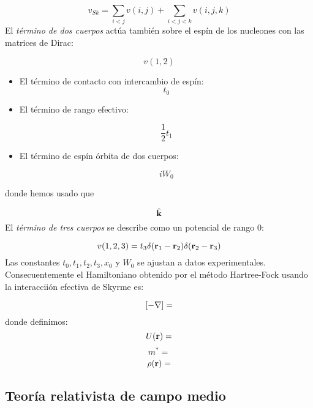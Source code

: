 \begin{equation}
    v_{Sk} = \sum_{i<j} v(i,j) + \sum_{i<j<k} v(i,j,k)
\end{equation}
El \textit{término de dos cuerpos} actúa también sobre el espín de los nucleones con las matrices de Dirac:

\begin{equation}
    v(1,2)    
\end{equation}

\begin{itemize}
    \item El término de contacto con intercambio de espín:
    \begin{equation*}
        t_0 
    \end{equation*}
    \item El término de rango efectivo:
    
    \begin{equation*}
        \frac{1}{2} t_1
    \end{equation*}
    \item El término de espín órbita de dos cuerpos:
    
    \begin{equation*}
        i W_0
    \end{equation*}
\end{itemize}
donde hemos usado que 

\begin{equation}
    \hat{\mathbf{k}}
\end{equation}
El \textit{término de tres cuerpos} se describe como un potencial de rango 0:

\begin{equation}
    v(1,2,3) = t_3 \delta (\mathbf{r}_1-\mathbf{r}_2)\delta (\mathbf{r}_2-\mathbf{r}_3)
\end{equation}
Las constantes $t_0,t_1,t_2,t_3,x_0$ y $W_0$ se ajustan a datos experimentales. Consecuentemente el Hamiltoniano obtenido por el método Hartree-Fock usando la interacciión efectiva de Skyrme es:

\begin{equation}
    \left[ -\nabla \right] = 
\end{equation}
donde definimos:
\begin{equation}
    U (\mathbf{r}) = 
\end{equation}
\begin{equation}
    m^* = 
\end{equation}
\begin{equation}
    \rho (\mathbf{r}) = 
\end{equation}



\subsection{Teoría relativista de campo medio}
